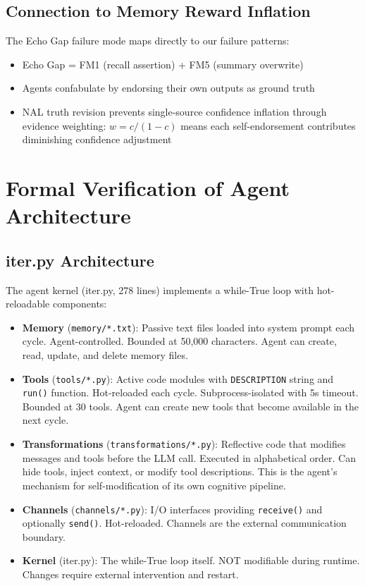 \documentclass{article}
\begin{document}
\subsection{Connection to Memory Reward Inflation}

The Echo Gap failure mode \citep{mri} maps directly to our failure patterns:
\begin{itemize}
    \item Echo Gap = FM1 (recall assertion) + FM5 (summary overwrite)
    \item Agents confabulate by endorsing their own outputs as ground truth
    \item NAL truth revision prevents single-source confidence inflation through evidence weighting: $w = c/(1-c)$ means each self-endorsement contributes diminishing confidence adjustment
\end{itemize}

\section{Formal Verification of Agent Architecture}
\label{sec:formal}

\subsection{iter.py Architecture}

The agent kernel (iter.py, 278 lines) implements a while-True loop with hot-reloadable components:

\begin{itemize}
    \item \textbf{Memory} (\texttt{memory/*.txt}): Passive text files loaded into system prompt each cycle. Agent-controlled. Bounded at 50{,}000 characters. Agent can create, read, update, and delete memory files.
    \item \textbf{Tools} (\texttt{tools/*.py}): Active code modules with \texttt{DESCRIPTION} string and \texttt{run()} function. Hot-reloaded each cycle. Subprocess-isolated with 5s timeout. Bounded at 30 tools. Agent can create new tools that become available in the next cycle.
    \item \textbf{Transformations} (\texttt{transformations/*.py}): Reflective code that modifies messages and tools before the LLM call. Executed in alphabetical order. Can hide tools, inject context, or modify tool descriptions. This is the agent's mechanism for self-modification of its own cognitive pipeline.
    \item \textbf{Channels} (\texttt{channels/*.py}): I/O interfaces providing \texttt{receive()} and optionally \texttt{send()}. Hot-reloaded. Channels are the external communication boundary.
    \item \textbf{Kernel} (iter.py): The while-True loop itself. NOT modifiable during runtime. Changes require external intervention and restart.
\end{itemize}
\end{document}
